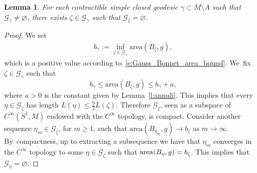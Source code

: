 \documentclass[JEP,XML,SOM,Unicode,NoFloatCountersInSection,published]{cedram}
\newcommand{\GG}{\mathcal{G}}
\newcommand{\area}{\mathrm{area}}
\theoremstyle{plain}
\newtheorem{Lemma}[Thm]{Lemma}
\theoremstyle{definition}
\begin{document}
\begin{Lemma}\label{l:innermost}
For each contractible simple closed geodesic $\gamma\subset M\setminus A$ such that $\GG_\gamma\neq\varnothing$, there exists $\zeta\in\GG_\gamma$ such that $\GG_\zeta=\varnothing$.
\end{Lemma}

\begin{proof}
We set
\begin{align*}
b_\gamma:=\inf_{\zeta\in\GG_\gamma} \area(B_\zeta,g),
\end{align*}
which is a positive value according to~\eqref{e:Gauss_Bonnet_area_bound}. We~fix $\zeta\in\GG_\gamma$ such that
\[
b_\gamma \leq\area(B_{\zeta},g)\leq b_\gamma +a,
\]
where $a>0$ is the constant given by Lemma~\ref{l:annuli}. This implies that every $\eta\in\GG_{\zeta}$ has length $L(\eta)\leq\tfrac92 L(\zeta)$. Therefore $\GG_{\zeta}$, seen as a subspace of $C^\infty(S^1,M)$ endowed with the $C^\infty$ topology, is compact. Consider another sequence $\eta_m\!\in\!\GG_{\zeta}$, for $m\!\geq\!1$, such that $\area(B_{\eta_m},g)\to b_{\zeta}$ as $m\to\infty$. By~compactness, up to extracting a subsequence we have that $\eta_m$ converges in the $C^\infty$ topology to some $\eta\in\GG_{\zeta}$ such that $\area(B_\eta,g)=\nobreak b_{\zeta}$. This implies that $\GG_\eta=\varnothing$.
\end{proof}
\end{document}

